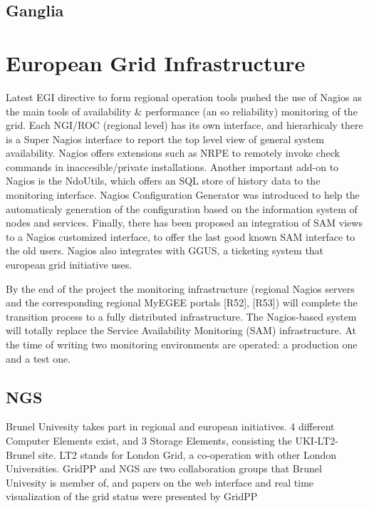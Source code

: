 \subsection{Ganglia}

\section{European Grid Infrastructure}
Latest EGI directive to form regional operation tools pushed the use of Nagios
\cite{imamagic2007grid} as the main tools of availability \& performance (an so
reliability) monitoring of the grid. Each NGI/ROC (regional level) has its own
interface, and hierarhicaly there is a Super Nagios interface to report the top
level view of general system availability. Nagios offers extensions such as NRPE
to remotely invoke check commands in inaccesible/private installations.
Another important add-on to Nagios is the NdoUtils, which offers an SQL store
of history data to the monitoring interface. Nagios Configuration Generator was
introduced to help the automaticaly generation of the configuration based on
the information system of nodes and services. Finally, there has been proposed
an integration of SAM views to a Nagios customized interface, to offer the last
good known SAM interface to the old users. Nagios also integrates with GGUS, a
ticketing system that european grid initiative uses.

By the end of the project the monitoring infrastructure (regional Nagios servers and the corresponding regional MyEGEE portals [R52], [R53]) will complete the transition process to a fully distributed infrastructure.
The Nagios-based system will totally replace the Service Availability Monitoring (SAM)
infrastructure. At the time of writing two monitoring environments are operated: a production one and a test one.


\subsection{NGS}
Brunel Univesity takes part in regional and european initiatives. 4 different
Computer Elements exist, and 3 Storage Elements, consisting the UKI-LT2-Brunel
site. LT2 stands for London Grid, a co-operation with other London Universities.
GridPP and NGS are two collaboration groups that Brunel Univesity is member of,
and papers on the web interface \cite{Hobson2007} and real time visualization of
the grid status were presented \cite{Huang2007} by GridPP
